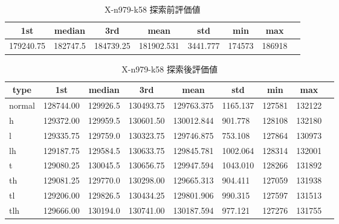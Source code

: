 \begin{table}[htbp]
    \caption{X-n979-k58 探索前評価値}
    \begin{tabular}{|l|l|l|l|l|l|l|l|}\hline
    \multicolumn{1}{|c|}{\textbf{1st}}
    &\multicolumn{1}{c|}{\textbf{median}}
    &\multicolumn{1}{c|}{\textbf{3rd}}
    &\multicolumn{1}{c|}{\textbf{mean}}
    &\multicolumn{1}{c|}{\textbf{std}}
    &\multicolumn{1}{c|}{\textbf{min}}
    &\multicolumn{1}{c|}{\textbf{max}}\\\hline
	179240.75 & 182747.5 & 184739.25 & 181902.531 & 3441.777 & 174573 & 186918\\\hline
	\end{tabular}
\end{table}
\begin{table}[htbp]
    \caption{X-n979-k58 探索後評価値}
    \begin{tabular}{|l|l|l|l|l|l|l|l|l|}\hline
    \multicolumn{1}{|c|}{\textbf{type}}
    &\multicolumn{1}{|c|}{\textbf{1st}}
    &\multicolumn{1}{c|}{\textbf{median}}
    &\multicolumn{1}{c|}{\textbf{3rd}}
    &\multicolumn{1}{c|}{\textbf{mean}}
    &\multicolumn{1}{c|}{\textbf{std}}
    &\multicolumn{1}{c|}{\textbf{min}}
    &\multicolumn{1}{c|}{\textbf{max}}\\\hline
	normal & 128744.00 & 129926.5 & 130493.75 & 129763.375 & 1165.137 & 127581 & 132122\\\hline
	h & 129372.00 & 129959.5 & 130601.50 & 130012.844 & 901.778 & 128108 & 132180\\\hline
	l & 129335.75 & 129759.0 & 130323.75 & 129746.875 & 753.108 & 127864 & 130973\\\hline
	lh & 129187.75 & 129584.5 & 130633.75 & 129845.781 & 1002.064 & 128314 & 132001\\\hline
	t & 129080.25 & 130045.5 & 130656.75 & 129947.594 & 1043.010 & 128266 & 131892\\\hline
	th & 129081.25 & 129770.0 & 130298.00 & 129665.313 & 904.411 & 127059 & 131938\\\hline
	tl & 129206.00 & 129826.5 & 130434.25 & 129801.906 & 990.315 & 127597 & 131513\\\hline
	tlh & 129666.00 & 130194.0 & 130741.00 & 130187.594 & 977.121 & 127276 & 131755\\\hline
	\end{tabular}
\end{table}
